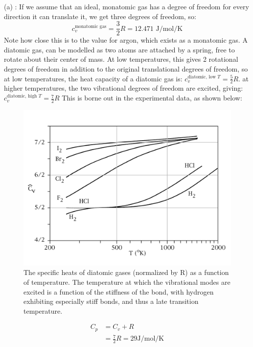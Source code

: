 \documentclass[12pt]{article}
\begin{document}
(a) : If we assume that an ideal, monatomic gas has a degree of freedom for every direction it can translate it, we get three degrees of freedom, so:
\begin{equation}
c_v^{\text{monatomic gas}} = \frac{3}{2} R = 12.471 \text{ J/mol/K}
\end{equation}
Note how close this is to the value for argon, which exists as a monatomic gas.   %
A diatomic gas, can be modelled as two atoms are attached by a spring, free to rotate about their center of mass. At low temperatures, this gives 2 rotational degrees of freedom in addition to the original translational degrees of freedom, so at low temperatures, the heat capacity of a diatomic gas is: $c_v^{\text{diatomic, low }T} = \frac{5}{2} R$.
at higher temperatures, the two vibrational degrees of freedom are excited, giving: $c_v^{\text{diatomic, high }T} = \frac{7}{2} R$
This is borne out in the experimental data, as shown below:
\begin{figure}[h]
\centering
\includegraphics[width=\textwidth]{DiatomicSpecHeat2}
\caption{The specific heats of diatomic gases (normalized by R) as a function of temperature. The temperature at which the vibrational modes are excited is a function of the stiffness of the bond, with hydrogen exhibiting especially stiff bonds, and thus a late transition temperature.}
\end{figure}

\begin{align*}
C_p &= C_v + R\\
&= \frac{7}{2} R =  29 \text{J}/\text{mol}/\text{K}
\end{align*}
\end{document}
